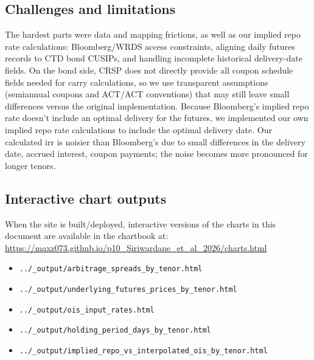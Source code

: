 \documentclass[12pt]{article}
\begin{document}
\subsection{Challenges and limitations}
The hardest parts were data and mapping frictions, as well as our implied repo rate calculations: Bloomberg/WRDS access constraints, aligning daily futures records to CTD bond CUSIPs, and handling incomplete historical delivery-date fields. On the bond side, CRSP does not directly provide all coupon schedule fields needed for carry calculations, so we use transparent assumptions (semiannual coupons and ACT/ACT conventions) that may still leave small differences versus the original implementation.
Because Bloomberg's implied repo rate doesn't include an optimal delivery for the futures, we implemented our own implied repo rate calculations to include the optimal delivery date. Our calculated irr is noisier than Bloomberg's due to small differences in the delivery date, accrued interest, coupon payments; the noise becomes more pronounced for longer tenors.
\subsection{Interactive chart outputs}

When the site is built/deployed, interactive versions of the charts in this document are available in the chartbook at:
\href{https://maxz073.github.io/p10_Siriwardane_et_al_2026/charts.html}{https://maxz073.github.io/p10\_Siriwardane\_et\_al\_2026/charts.html}

\begin{itemize}
\item \texttt{../\_output/arbitrage\_spreads\_by\_tenor.html}
\item \texttt{../\_output/underlying\_futures\_prices\_by\_tenor.html}
\item \texttt{../\_output/ois\_input\_rates.html}
\item \texttt{../\_output/holding\_period\_days\_by\_tenor.html}
\item \texttt{../\_output/implied\_repo\_vs\_interpolated\_ois\_by\_tenor.html}
\end{itemize}
\end{document}
